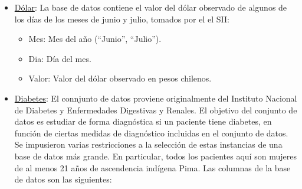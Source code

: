 \documentclass[
  11pt,
]{book}
\providecommand{\tightlist}{%
  \setlength{\itemsep}{0pt}\setlength{\parskip}{0pt}}
\theoremstyle{definition}
\theoremstyle{definition}
\theoremstyle{definition}
\theoremstyle{definition}
\theoremstyle{remark}
\begin{document}
\begin{itemize}
  \begin{itemize}
  \tightlist
  \item
    age: edad del paciente (en años).
  \item
    sex: sexo del paciente (Hombre: 1 y Mujer: 0).
  \item
    cp: Tipo de dolor en el pecho, Valor 1: angina típica, Valor 2: angina atípica, Valor 3: dolor no anginoso, Valor 4: asintomático.
  \item
    trtbps: presión arterial en reposo (en mm Hg).
  \item
    chol: nivel de colestorol (en mg/dl).
  \item
    fbs: azúcar en sangre en ayunas \(>\) 120 mg/dl (V = 1; F = 0).
  \item
    thalachh: frecuencia cardíaca máxima alcanzada (en latidos por minuto).
  \item
    oldpeak: tiempo de duración del último ataque al corazón (en minutos).
  \end{itemize}
\item
  \href{https://raw.githubusercontent.com/Dfranzani/Bases-de-datos-para-cursos/main/2022-2/Estad\%C3\%ADstica\%201/dolar.csv}{Dólar}: La base de datos contiene el valor del dólar observado de algunos de los días de los meses de junio y julio, tomados por el el SII:

  \begin{itemize}
  \tightlist
  \item
    Mes: Mes del año (``Junio'', ``Julio'').
  \item
    Dia: Día del mes.
  \item
    Valor: Valor del dólar observado en pesos chilenos.
  \end{itemize}
\item
  \href{https://raw.githubusercontent.com/Dfranzani/Bases-de-datos-para-cursos/main/2022-2/Estad\%C3\%ADstica\%201/diabetes.csv}{Diabetes}: El connjunto de datos proviene originalmente del Instituto Nacional de Diabetes y Enfermedades Digestivas y Renales. El objetivo del conjunto de datos es estudiar de forma diagnóstica si un paciente tiene diabetes, en función de ciertas medidas de diagnóstico incluidas en el conjunto de datos. Se impusieron varias restricciones a la selección de estas instancias de una base de datos más grande. En particular, todos los pacientes aquí son mujeres de al menos 21 años de ascendencia indígena Pima. Las columnas de la base de datos son las siguientes:


\end{itemize}
\end{document}
